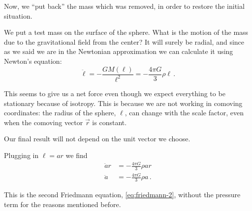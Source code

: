 \documentclass[main.tex]{subfiles}
\begin{document}
Now, we ``put back'' the mass which was removed, in order to restore the initial situation.

We put a test mass on the surface of the sphere. What is the motion of the mass due to the gravitational field from the center? It will surely be radial, and since as we said we are in the Newtonian approximation we can calculate it using Newton's equation: 
%
\begin{equation} \label{eq:newtonian-approx-acceleration}
\ddot{\ell} = - \frac{GM(\ell)}{\ell^2} = - \frac{4 \pi G}{3} \rho \ell
\,.
\end{equation}

This seems to give us a net force even though we expect everything to be stationary because of isotropy.
This is because we are not working in comoving coordinates: the radius of the sphere,  \(\ell\), can change with the scale factor, even when the comoving vector \(\vec{r}\) is constant.

Our final result will not depend on the unit vector we choose.


Plugging in \(\ell = a r\) we find
\begin{align}
  \ddot{a} r &= - \frac{4 \pi G}{3} \rho a r \\
  \ddot{a} &= - \frac{4 \pi G}{3} \rho a\,.
\end{align}

This is the second Friedmann equation, \eqref{eq:friedmann-2}, without the pressure term for the reasons mentioned before.

\end{document}
